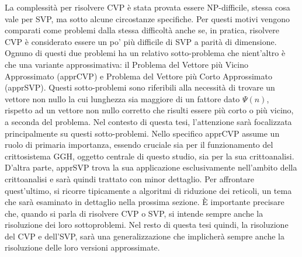 La complessità per risolvere CVP è stata provata essere NP-difficile\cite{CVP-NP09}, stessa
cosa vale per SVP, ma sotto alcune circostanze specifiche\cite{SVP-NP02}. Per questi motivi vengono
comparati come problemi dalla stessa difficoltà anche se, in pratica, risolvere CVP è considerato 
essere un po' più difficile di SVP a parità di dimensione.
Ognuno di questi due problemi ha un relativo sotto-problema che nient'altro è che una 
variante approssimativa: il Problema del Vettore più Vicino Approssimato (apprCVP) 
e Problema del Vettore più Corto Approssimato  (apprSVP). 
Questi sotto-problemi sono riferibili alla necessità di trovare un vettore non nullo la 
cui lunghezza sia maggiore di un fattore dato $\Psi(n)$, rispetto ad un vettore non nullo 
corretto che risulti essere più corto o più vicino, a seconda del problema.
Nel contesto di questa tesi, l'attenzione sarà focalizzata principalmente su questi 
sotto-problemi. Nello specifico apprCVP assume un ruolo di primaria importanza, essendo cruciale sia per 
il funzionamento del crittosistema GGH, oggetto centrale di questo studio, sia per la sua 
crittoanalisi. D'altra parte, apprSVP trova la sua applicazione esclusivamente nell'ambito
della crittoanalisi e sarà quindi trattato con minor dettaglio. 
Per affrontare quest'ultimo, si ricorre tipicamente a algoritmi di riduzione dei 
reticoli, un tema che sarà esaminato in dettaglio nella prossima sezione.
È importante precisare che, quando si parla di risolvere CVP o SVP, si intende sempre anche la 
risoluzione dei loro sottoproblemi. Nel resto di questa tesi quindi, la risoluzione 
del CVP e dell'SVP, sarà una generalizzazione che implicherà sempre anche la risoluzione delle loro versioni 
approssimate.